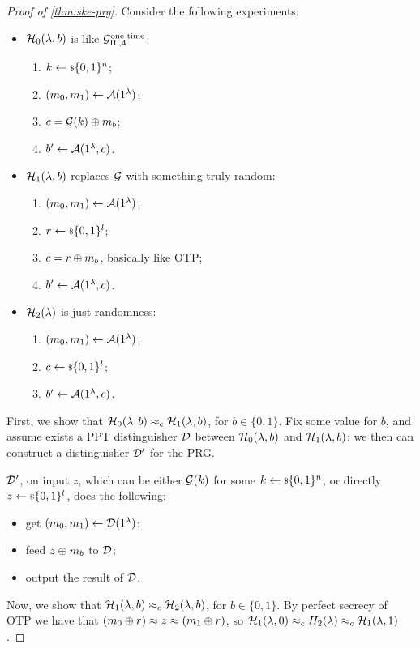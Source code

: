 \begin{proof}[Proof of \cref{thm:ske-prg}]
	Consider the following experiments:
	\begin{itemize}
		\item $\mathcal{H}_0(\lambda, b)$ is like $\mathcal{G}^{\scriptstyle \text{one time}}_{\Pi, \mathcal{A}}$:
		\begin{enumerate}
			\item $k \leftarrow {\scriptstyle \$} {\{0,1\}^{n}}$;
			\item $(m_0, m_1) \leftarrow \mathcal{A}(1^{\lambda})$;
			\item $c = \mathcal{G}(k) \oplus m_b$;
			\item $b' \leftarrow \mathcal{A}(1^{\lambda}, c)$.
		\end{enumerate}
		\item $\mathcal{H}_1(\lambda, b)$ replaces $\mathcal{G}$ with something truly random:
		\begin{enumerate}
			\item $(m_0, m_1) \leftarrow \mathcal{A}(1^{\lambda})$;
			\item $r \leftarrow {\scriptstyle \$} {\{0,1\}^{l}}$;
			\item $c = r \oplus m_b$, basically like \ac{OTP};
			\item $b' \leftarrow \mathcal{A}(1^{\lambda}, c)$.
		\end{enumerate}
		\item $\mathcal{H}_2(\lambda)$ is just randomness:
		\begin{enumerate}
			\item $(m_0, m_1) \leftarrow \mathcal{A}(1^{\lambda})$;
			\item $c \leftarrow {\scriptstyle \$} {\{0,1\}^{l}}$;
			\item $b' \leftarrow \mathcal{A}(1^{\lambda}, c)$.
		\end{enumerate}
	\end{itemize}

	First, we show that $\mathcal{H}_0(\lambda, b) \approx_c \mathcal{H}_1(\lambda, b)$, for $b \in \{0,1\}$.
	Fix some value for $b$, and assume exists a \ac{PPT} distinguisher $\mathcal{D}$ between $\mathcal{H}_0(\lambda, b)$ and $\mathcal{H}_1(\lambda, b)$: we then can construct a distinguisher $\mathcal{D}'$ for the \ac{PRG}.

	$\mathcal{D}'$, on input $z$, which can be either $\mathcal{G}(k)$ for some $k \leftarrow {\scriptstyle \$} {\{0,1\}^{n}}$, or directly $z \leftarrow {\scriptstyle \$} {\{0,1\}^{l}}$, does the following:
	\begin{itemize}
		\item get $(m_0, m_1) \leftarrow \mathcal{D}(1^{\lambda})$;
		\item feed $z \oplus m_b$ to $\mathcal{D}$;
		\item output the result of $\mathcal{D}$.
	\end{itemize}

	Now, we show that $\mathcal{H}_1(\lambda, b) \approx_c \mathcal{H}_2(\lambda, b)$, for $b \in \{0,1\}$.
	By perfect secrecy of \ac{OTP} we have that $(m_0 \oplus r) \approx z \approx (m_1 \oplus r)$, so $\mathcal{H}_1(\lambda, 0) \approx_c H_2(\lambda) \approx_c \mathcal{H}_1(\lambda, 1)$.
\end{proof}

